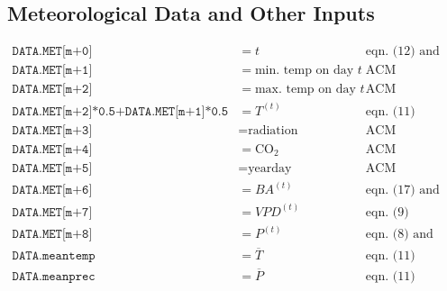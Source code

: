 \documentclass{article}
\begin{document}
		\subsection{Meteorological Data and Other Inputs}
			\begin{align*}
				\texttt{DATA.MET[m+0]} &= t & \text{eqn. (12) and (13)}\\
				\texttt{DATA.MET[m+1]} &= \text{min. temp on day $t$} & \text{ACM}\\
				\texttt{DATA.MET[m+2]} &= \text{max. temp on day $t$} & \text{ACM}\\
				\texttt{DATA.MET[m+2]*0.5+DATA.MET[m+1]*0.5} &= T^{(t)} & \text{eqn. (11)}\\
				\texttt{DATA.MET[m+3]} &= \text{radiation} & \text{ACM}\\
				\texttt{DATA.MET[m+4]} &= \text{CO}_2 & \text{ACM}\\
				\texttt{DATA.MET[m+5]} &= \text{yearday} & \text{ACM}\\
				\texttt{DATA.MET[m+6]} &= BA^{(t)} & \text{eqn. (17) and (18)}\\
				\texttt{DATA.MET[m+7]} &= VPD^{(t)} & \text{eqn. (9)}\\
				\texttt{DATA.MET[m+8]} &= P^{(t)} & \text{eqn. (8) and (11)}\\
				\texttt{DATA.meantemp} &= \overline{T} & \text{eqn. (11)}\\
				\texttt{DATA.meanprec} &= \overline{P} & \text{eqn. (11)}
			\end{align*}
\end{document}
